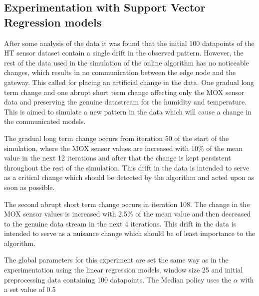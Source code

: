 \documentclass{mpaper}
\begin{document}
\subsection{Experimentation with Support Vector Regression models}

After some analysis of the data it was found that the initial 100 datapoints of the HT sensor dataset contain a single drift in the observed pattern. However, the rest of the data used in the simulation of the online algorithm has no noticeable changes, which results in no communication between the edge node and the gateway. This called for placing an artificial change in the data. One gradual long term change and one abrupt short term change affecting only the MOX sensor data and preserving the genuine datastream for the humidity and temperature. This is aimed to simulate a new pattern in the data which will cause a change in the communicated models.

The gradual long term change occurs from iteration 50 of the start of the simulation, where the MOX sensor values are increased with 10\% of the mean value in the next 12 iterations and after that the change is kept persistent throughout the rest of the simulation. This drift in the data is intended to serve as a critical change \cite{lautay2018} which should be detected by the algorithm and acted upon as soon as possible.

The second abrupt short term change occurs in iteration 108. The change in the MOX sensor values is increased with 2.5\% of the mean value and then decreased to the genuine data stream in the next 4 iterations. This drift in the data is intended to serve as a nuisance change \cite{lautay2018} which should be of least importance to the algorithm.

The global parameters for this experiment are set the same way as in the experimentation using the linear regression models, window size 25 and initial preprocessing data containing 100 datapoints. The Median policy uses the $\alpha$ with a set value of 0.5
\end{document}
